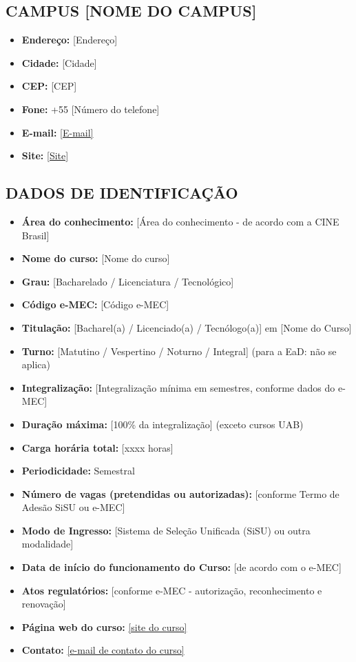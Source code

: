 \subsection*{CAMPUS [NOME DO CAMPUS]}

\begin{itemize}
    \item \textbf{Endereço:} [Endereço]
    \item \textbf{Cidade:} [Cidade]
    \item \textbf{CEP:} [CEP]
    \item \textbf{Fone:} +55 [Número do telefone]
    \item \textbf{E-mail:} \href{mailto:[E-mail]}{[E-mail]}
    \item \textbf{Site:} \url{[Site]}
\end{itemize}

\subsection*{DADOS DE IDENTIFICAÇÃO}

\begin{itemize}
    \item \textbf{Área do conhecimento:} [Área do conhecimento - de acordo com a CINE Brasil]
    \item \textbf{Nome do curso:} [Nome do curso]
    \item \textbf{Grau:} [Bacharelado / Licenciatura / Tecnológico]
    \item \textbf{Código e-MEC:} [Código e-MEC]
    \item \textbf{Titulação:} [Bacharel(a) / Licenciado(a) / Tecnólogo(a)] em [Nome do Curso]
    \item \textbf{Turno:} [Matutino / Vespertino / Noturno / Integral] (para a EaD: não se aplica)
    \item \textbf{Integralização:} [Integralização mínima em semestres, conforme dados do e-MEC]
    \item \textbf{Duração máxima:} [100\% da integralização] (exceto cursos UAB)
    \item \textbf{Carga horária total:} [xxxx horas]
    \item \textbf{Periodicidade:} Semestral
    \item \textbf{Número de vagas (pretendidas ou autorizadas):} [conforme Termo de Adesão SiSU ou e-MEC]
    \item \textbf{Modo de Ingresso:} [Sistema de Seleção Unificada (SiSU) ou outra modalidade]
    \item \textbf{Data de início do funcionamento do Curso:} [de acordo com o e-MEC]
    \item \textbf{Atos regulatórios:} [conforme e-MEC - autorização, reconhecimento e renovação]
    \item \textbf{Página web do curso:} \url{[site do curso]}
    \item \textbf{Contato:} \href{mailto:[e-mail de contato]}{[e-mail de contato do curso]}
\end{itemize}
